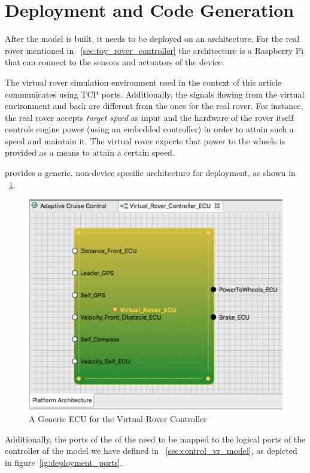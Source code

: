 \section{Deployment and Code Generation}
\label{sec:deploy_generate}

After the model is built, it needs to be deployed on an architecture. For the
real rover mentioned in \sect~\ref{sec:toy_rover_controller} the architecture
is a Raspberry Pi that can connect to the sensors and actuators of the device.

The virtual rover simulation environment used in the context of this article
communicates using TCP ports. Additionally, the signals flowing from the virtual
environment and back are different from the ones for the real rover. For
instance, the real rover accepts \emph{target speed} as input and the hardware
of the rover itself controls engine power (using an embedded \pid controller) in
order to attain such a speed and maintain it. The virtual rover expects that
power to the wheels is provided as a means to attain a certain speed.

\af provides a generic, non-device specific architecture for deployment, as
shown in \fig~\ref{fig:deployment_general}.

\begin{figure}[!h]
\centering
\includegraphics[width=.8\textwidth]{images/deployment_general.png}
\caption{A Generic ECU for the Virtual Rover Controller}
\label{fig:deployment_general}
\end{figure}

Additionally, the ports of the of the \ecu need to be mapped to the logical
ports of the controller of the model we have defined in
\sect~\ref{sec:control_vr_model}, as depicted in
figure~\ref{ig:deployment_ports}.


